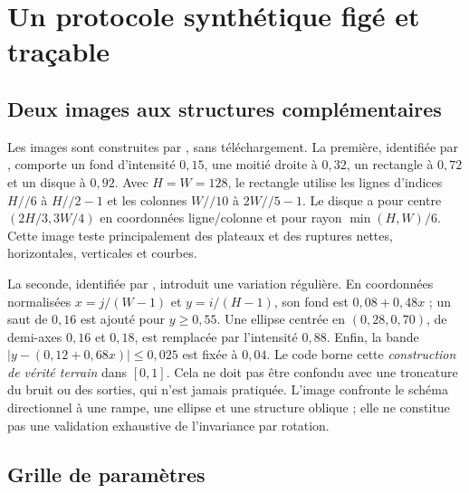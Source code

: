\section{Un protocole synthétique figé et traçable}
\label{sec:protocol}

\subsection{Deux images aux structures complémentaires}

Les images sont construites par , sans téléchargement.
La première, identifiée par , comporte un fond d'intensité
$0{,}15$, une moitié droite à $0{,}32$, un rectangle à $0{,}72$ et un
disque à $0{,}92$. Avec $H=W=128$, le rectangle utilise les lignes
d'indices $H//6$ à $H//2-1$ et les colonnes $W//10$ à $2W//5-1$.
Le disque a pour centre $(2H/3,3W/4)$ en coordonnées ligne/colonne et
pour rayon $\min(H,W)/6$. Cette image teste principalement des plateaux
et des ruptures nettes, horizontales, verticales et courbes.

La seconde, identifiée par , introduit une variation régulière.
En coordonnées normalisées $x=j/(W-1)$ et $y=i/(H-1)$, son fond est
$0{,}08+0{,}48x$ ; un saut de $0{,}16$ est ajouté pour $y\geq0{,}55$.
Une ellipse centrée en $(0{,}28,0{,}70)$, de demi-axes $0{,}16$ et
$0{,}18$, est remplacée par l'intensité $0{,}88$. Enfin, la bande
$|y-(0{,}12+0{,}68x)|\leq0{,}025$ est fixée à $0{,}04$.
Le code borne cette \emph{construction de vérité terrain} dans $[0,1]$.
Cela ne doit pas être confondu avec une troncature du bruit ou des sorties,
qui n'est jamais pratiquée. L'image confronte le schéma directionnel à
une rampe, une ellipse et une structure oblique ; elle ne constitue pas
une validation exhaustive de l'invariance par rotation.

\subsection{Grille de paramètres}

